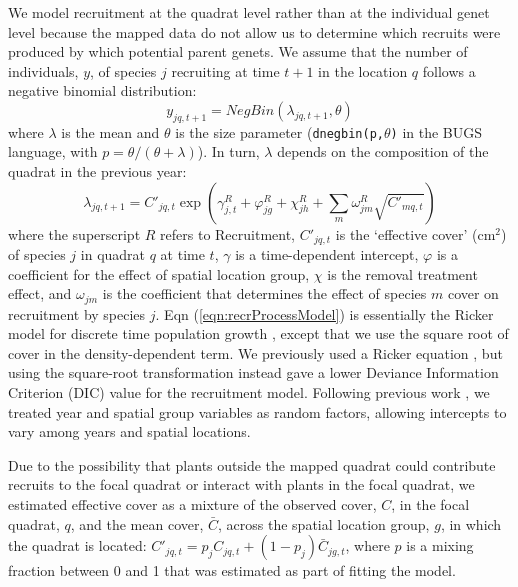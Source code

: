 \documentclass[11pt]{article}
\begin{document}
We model recruitment at the quadrat level rather than at the individual genet level because the mapped data do not allow 
us to determine which recruits were produced by which potential parent genets. We assume that the number of individuals, $y$, of species $j$ recruiting at 
time $t+1$ in the location $q$ follows a negative binomial distribution:
\begin{equation}
y_{jq,t+1}= NegBin(\lambda_{jq,t+1},\theta) 	   
\label{eqn:recrDataModel}
\end{equation}
where $\lambda$ is the mean and $\theta$ is the size parameter (\texttt{dnegbin(p,$\theta$)} in the BUGS language, with $p=\theta/(\theta+\lambda)$). 
In turn, $\lambda$ depends on the composition of the quadrat in the previous year:
\begin{equation}
\lambda_{jq,t+1} = C'_{jq,t} \exp{\left(\gamma_{j,t}^R +  \varphi_{jg}^R + \chi_{jh}^R + 
\sum \limits_{m} \omega_{jm}^R \sqrt{C'_{mq,t}} \right)}
\label{eqn:recrProcessModel}
\end{equation}
where the superscript $R$ refers to Recruitment, $C'_{jq,t}$ is the `effective cover' (cm$^2$) of species $j$ in quadrat $q$ at time $t$, $\gamma$ 
is a time-dependent intercept, $\varphi$ is a coefficient for the effect of spatial location group,
$\chi$ is the removal treatment effect, and $\omega_{jm}$ is the coefficient that determines the effect of species $m$ cover on recruitment by species $j$. 
Eqn (\ref{eqn:recrProcessModel}) is essentially the Ricker model for discrete time population growth \citep{ricker_stock_1954}, except that we use the square root of cover in the density-dependent term. We previously used a Ricker equation \citep{adler_coexistence_2010}, but using the square-root transformation instead gave a lower Deviance Information Criterion (DIC) value \citep{spiegelhalter_bayesian_2002} for the recruitment model. Following previous work \citep{adler_coexistence_2010}, we treated year and spatial group variables as random factors, allowing intercepts to vary among years and spatial locations. 

Due to the possibility that plants outside the mapped quadrat could contribute recruits to the focal quadrat or interact with plants in the focal quadrat, we estimated effective cover as a mixture of the observed cover, $C$, in the focal quadrat, $q$, and the mean cover, $\bar{C}$, across the spatial location group, $g$, in which the 
quadrat is located: $C'_{jq,t}=p_j C_{jq,t}+(1-p_j) \bar{C}_{jg,t}$, where $p$ is a mixing fraction between 0 and 1 that was estimated as part of fitting the model.
\end{document}
